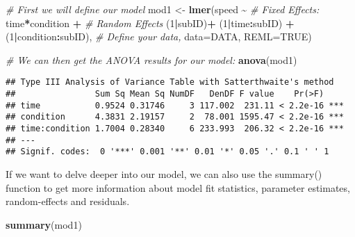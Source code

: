 \documentclass[]{article}
\newenvironment{Shaded}{\begin{snugshade}}{\end{snugshade}}
\newcommand{\CommentTok}[1]{\textcolor[rgb]{0.56,0.35,0.01}{\textit{#1}}}
\newcommand{\DataTypeTok}[1]{\textcolor[rgb]{0.13,0.29,0.53}{#1}}
\newcommand{\DecValTok}[1]{\textcolor[rgb]{0.00,0.00,0.81}{#1}}
\newcommand{\KeywordTok}[1]{\textcolor[rgb]{0.13,0.29,0.53}{\textbf{#1}}}
\newcommand{\NormalTok}[1]{#1}
\newcommand{\OperatorTok}[1]{\textcolor[rgb]{0.81,0.36,0.00}{\textbf{#1}}}
\newcommand{\OtherTok}[1]{\textcolor[rgb]{0.56,0.35,0.01}{#1}}
\newcommand{\StringTok}[1]{\textcolor[rgb]{0.31,0.60,0.02}{#1}}
\begin{document}
\begin{Shaded}
\begin{Highlighting}[]
\CommentTok{\# First we will define our model}
\NormalTok{mod1 <{-}}\StringTok{ }\KeywordTok{lmer}\NormalTok{(speed }\OperatorTok{\textasciitilde{}}\StringTok{ }
\StringTok{               }\CommentTok{\# Fixed Effects:}
\StringTok{               }\NormalTok{time}\OperatorTok{*}\NormalTok{condition }\OperatorTok{+}\StringTok{ }
\StringTok{               }\CommentTok{\# Random Effects}
\StringTok{               }\NormalTok{(}\DecValTok{1}\OperatorTok{|}\NormalTok{subID)}\OperatorTok{+}\StringTok{ }\NormalTok{(}\DecValTok{1}\OperatorTok{|}\NormalTok{time}\OperatorTok{:}\NormalTok{subID) }\OperatorTok{+}\StringTok{ }\NormalTok{(}\DecValTok{1}\OperatorTok{|}\NormalTok{condition}\OperatorTok{:}\NormalTok{subID), }
               \CommentTok{\# Define your data, }
             \DataTypeTok{data=}\NormalTok{DATA, }\DataTypeTok{REML=}\OtherTok{TRUE}\NormalTok{)}

\CommentTok{\# We can then get the ANOVA results for our model:}
\KeywordTok{anova}\NormalTok{(mod1)}
\end{Highlighting}
\end{Shaded}

\begin{verbatim}
## Type III Analysis of Variance Table with Satterthwaite's method
##                Sum Sq Mean Sq NumDF   DenDF F value    Pr(>F)    
## time           0.9524 0.31746     3 117.002  231.11 < 2.2e-16 ***
## condition      4.3831 2.19157     2  78.001 1595.47 < 2.2e-16 ***
## time:condition 1.7004 0.28340     6 233.993  206.32 < 2.2e-16 ***
## ---
## Signif. codes:  0 '***' 0.001 '**' 0.01 '*' 0.05 '.' 0.1 ' ' 1
\end{verbatim}

If we want to delve deeper into our model, we can also use the summary()
function to get more information about model fit statistics, parameter
estimates, random-effects and residuals.

\begin{Shaded}
\begin{Highlighting}[]
\KeywordTok{summary}\NormalTok{(mod1)}
\end{Highlighting}
\end{Shaded}
\end{document}

